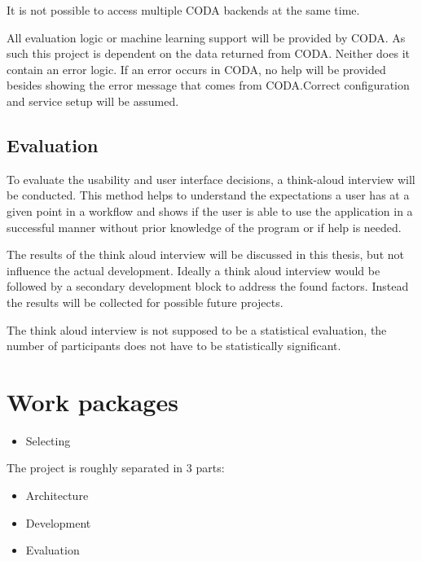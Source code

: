 \documentclass[12pt,a4paper,titlepage,oneside,BCOR1cm]{scrreprt}
\begin{document}
It is not possible to access multiple CODA backends at the same time. 

All evaluation logic or machine learning support will be provided by CODA. As such this project is dependent on the data returned from CODA. Neither does it contain an error logic. If an error occurs in CODA, no help will be provided besides showing the error message that comes from CODA.Correct configuration and service setup will be assumed. 

\section{Evaluation}

To evaluate the usability and user interface decisions, a think-aloud interview will be conducted. This method helps to understand the expectations a user has at a given point in a workflow and shows if the user is able to use the application in a successful manner without prior knowledge of the program or if help is needed.

The results of the think aloud interview will be discussed in this thesis, but not influence the actual development. Ideally a think aloud interview would be followed by a secondary development block to address the found factors. Instead the results will be collected for possible future projects.

The think aloud interview is not supposed to be a statistical evaluation, the number of participants does not have to be statistically significant. 

\chapter{Work packages}

\begin{itemize}
  \item Selecting
\end{itemize}

The project is roughly separated in 3 parts:
\begin{itemize}
  \item Architecture
  \item Development
  \item Evaluation
\end{itemize}
\end{document}
